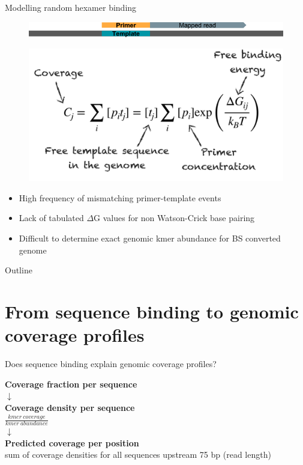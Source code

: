 \documentclass[10pt]{beamer}
\begin{document}
\begin{frame}{Modelling random hexamer binding}
  \vspace{-2cm}
  \begin{figure}
      \centering
      \includegraphics[scale=0.3, trim={0 3cm 0 8cm}, clip]{template_primer.png}
  \end{figure}
\begin{figure}
  \includegraphics[scale=0.3]{model_w_labels.png}
\end{figure}
\begin{itemize}
  \item High frequency of mismatching primer-template events
  \item Lack of tabulated $\Delta$G values for non Watson-Crick base pairing
  \item Difficult to determine exact genomic kmer abundance for BS converted genome
\end{itemize}
\end{frame}

\begin{frame}{Outline}
    \tableofcontents
\end{frame}


\section{From sequence binding to genomic coverage profiles}

\begin{frame}{Does sequence binding explain genomic coverage profiles?}
  \begin{center}
    \textbf{Coverage fraction per sequence} \\
    $\downarrow$ \\
    \textbf{Coverage density per sequence} \\
    $\frac{kmer\ coverage}{kmer\ abundance}$ \\
    $\downarrow$ \\
    \textbf{Predicted coverage per position} \\
    sum of coverage densities for all sequences upstream 75 bp (read length)
  \end{center}
\end{frame}
\end{document}
